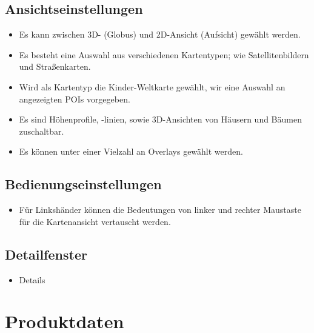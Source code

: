 \documentclass[10pt]{scrreprt}
\begin{document}
\section{Ansichtseinstellungen}
\begin{itemize}
\item Es kann zwischen 3D- (Globus) und 2D-Ansicht (Aufsicht) gewählt werden.
\item Es besteht eine Auswahl aus verschiedenen Kartentypen; wie Satellitenbildern und Straßenkarten.
\item Wird als Kartentyp die Kinder-Weltkarte gewählt, wir eine Auswahl an angezeigten POIs vorgegeben.
\item Es sind Höhenprofile, -linien, sowie 3D-Ansichten von Häusern und Bäumen zuschaltbar.
\item Es können unter einer Vielzahl an Overlays gewählt werden.
\end{itemize}

\section{Bedienungseinstellungen}
\begin{itemize}
\item Für Linkshänder können die Bedeutungen von linker und rechter Maustaste für die Kartenansicht vertauscht werden.
\end{itemize}

\section{Detailfenster}
\begin{itemize}
\item Details
\end{itemize}




\chapter{Produktdaten}
\end{document}
